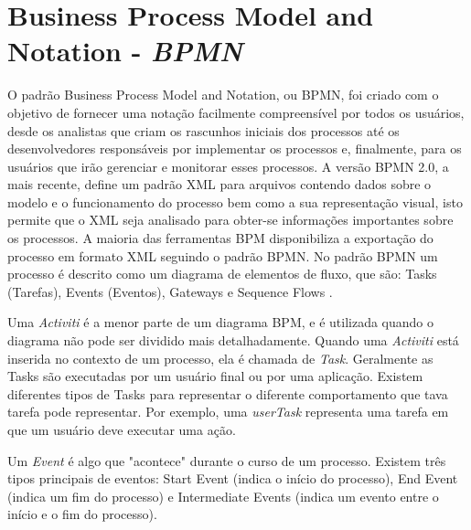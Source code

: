 \documentclass[12pt]{article}
\begin{document}
\section{Business Process Model and Notation - \emph{BPMN}}
O padrão Business Process Model and Notation, ou BPMN, foi criado com o objetivo de fornecer uma notação facilmente compreensível por todos os usuários, desde os analistas que criam os rascunhos iniciais dos processos até os desenvolvedores responsáveis por implementar os processos e, finalmente, para os usuários que irão gerenciar e monitorar esses processos\cite{model2011notation}. A versão BPMN 2.0, a mais recente, define um padrão XML para arquivos contendo dados sobre o modelo e o funcionamento do processo bem como a sua representação visual\cite{kurzdiagram}, isto permite que o XML seja analisado para obter-se informações importantes sobre os processos. A maioria das ferramentas BPM disponibiliza a exportação do processo em formato XML seguindo o padrão BPMN. No padrão BPMN um processo é descrito como um diagrama de elementos de fluxo, que são: Tasks (Tarefas), Events (Eventos), Gateways e Sequence Flows \cite{kurzdiagram}.



Uma \emph{Activiti} é a menor parte de um diagrama BPM, e é utilizada quando o diagrama não pode ser dividido mais detalhadamente. Quando uma \emph{Activiti} está inserida no contexto de um processo, ela é chamada de \emph{Task}. Geralmente as Tasks são executadas por um usuário final ou por uma aplicação. Existem diferentes tipos de Tasks para representar o diferente comportamento que tava tarefa pode representar. Por exemplo, uma \emph{userTask} representa uma tarefa em que um usuário deve executar uma ação.

Um \emph{Event} é algo que "acontece" durante o curso de um processo\cite{model2011notation}. Existem três tipos principais de eventos: Start Event (indica o início do processo), End Event (indica um fim do processo) e Intermediate Events (indica um evento entre o início e o fim do processo).
\end{document}
